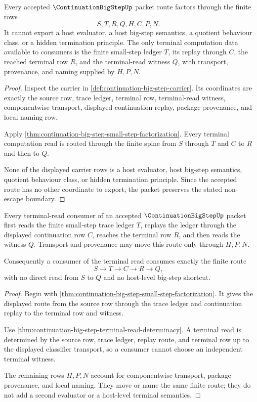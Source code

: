\begin{theorem}
\label{thm:continuation-big-step-nonescape}
Every accepted $\ContinuationBigStepUp$ packet route factors through the finite rows
$$
S,T,R,Q,H,C,P,N.
$$
It cannot export a host evaluator, a host big-step semantics, a quotient behaviour class, or a hidden termination principle. The only terminal computation data available to consumers is the finite small-step ledger $T$, its replay through $C$, the reached terminal row $R$, and the terminal-read witness $Q$, with transport, provenance, and naming supplied by $H,P,N$.
\end{theorem}
\begin{proof}
Inspect the carrier in \autoref{def:continuation-big-step-carrier}. Its coordinates are exactly the source row, trace ledger, terminal row, terminal-read witness, componentwise transport, displayed continuation replay, package provenance, and local naming row.

Apply \autoref{thm:continuation-big-step-small-step-factorization}. Every terminal computation read is routed through the finite spine from $S$ through $T$ and $C$ to $R$ and then to $Q$.

None of the displayed carrier rows is a host evaluator, host big-step semantics, quotient behaviour class, or hidden termination principle. Since the accepted route has no other coordinate to export, the packet preserves the stated non-escape boundary.
\end{proof}

\begin{theorem}
\label{thm:continuation-big-step-consumer-exactness}
Every terminal-read consumer of an accepted $\ContinuationBigStepUp$ packet first reads the finite small-step trace ledger $T$, replays the ledger through the displayed continuation row $C$, reaches the terminal row $R$, and then reads the witness $Q$. Transport and provenance may move this route only through $H,P,N$.

Consequently a consumer of the terminal read consumes exactly the finite route
$$
S \longrightarrow T \longrightarrow C \longrightarrow R \longrightarrow Q,
$$
with no direct read from $S$ to $Q$ and no host-level big-step shortcut.
\end{theorem}
\begin{proof}
Begin with \autoref{thm:continuation-big-step-small-step-factorization}. It gives the displayed route from the source row through the trace ledger and continuation replay to the terminal row and witness.

Use \autoref{thm:continuation-big-step-terminal-read-determinacy}. A terminal read is determined by the source row, trace ledger, replay route, and terminal row up to the displayed classifier transport, so a consumer cannot choose an independent terminal witness.

The remaining rows $H,P,N$ account for componentwise transport, package provenance, and local naming. They move or name the same finite route; they do not add a second evaluator or a host-level terminal semantics.
\end{proof}

